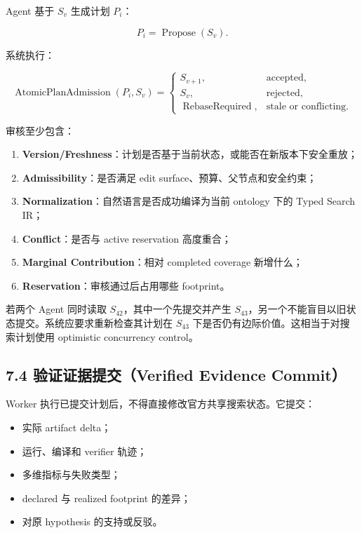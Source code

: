 \documentclass[
  11pt]{ctexart}
\providecommand{\tightlist}{%
  \setlength{\itemsep}{0pt}\setlength{\parskip}{0pt}}
\begin{document}
Agent 基于 \(S_v\) 生成计划 \(P_i\)：

\[
P_i=\operatorname{Propose}(S_v).
\]

系统执行：

\[
\operatorname{AtomicPlanAdmission}(P_i,S_v)=
\begin{cases}
S_{v+1}, & \text{accepted},\\
S_v, & \text{rejected},\\
\operatorname{RebaseRequired}, & \text{stale or conflicting}.
\end{cases}
\]

审核至少包含：

\begin{enumerate}
\def\labelenumi{\arabic{enumi}.}
\tightlist
\item
  \textbf{Version/Freshness}：计划是否基于当前状态，或能否在新版本下安全重放；
\item
  \textbf{Admissibility}：是否满足 edit
  surface、预算、父节点和安全约束；
\item
  \textbf{Normalization}：自然语言是否成功编译为当前 ontology 下的 Typed
  Search IR；
\item
  \textbf{Conflict}：是否与 active reservation 高度重合；
\item
  \textbf{Marginal Contribution}：相对 completed coverage 新增什么；
\item
  \textbf{Reservation}：审核通过后占用哪些 footprint。
\end{enumerate}

若两个 Agent 同时读取 \(S_{42}\)，其中一个先提交并产生
\(S_{43}\)，另一个不能盲目以旧状态提交。系统应要求重新检查其计划在
\(S_{43}\) 下是否仍有边际价值。这相当于对搜索计划使用 optimistic
concurrency control。

\subsection{7.4 验证证据提交（Verified Evidence
Commit）}\label{ux9a8cux8bc1ux8bc1ux636eux63d0ux4ea4verified-evidence-commit}

Worker 执行已提交计划后，不得直接修改官方共享搜索状态。它提交：

\begin{itemize}
\tightlist
\item
  实际 artifact delta；
\item
  运行、编译和 verifier 轨迹；
\item
  多维指标与失败类型；
\item
  declared 与 realized footprint 的差异；
\item
  对原 hypothesis 的支持或反驳。
\end{itemize}
\end{document}
